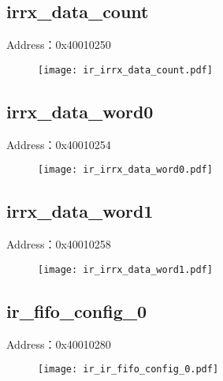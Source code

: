 \subsection{irrx\_data\_count}
\label{ir-irrx-data-count}
Address：0x40010250
 \begin{figure}[H]
\texttt{[image: ir\_irrx\_data\_count.pdf]}
\end{figure}

\subsection{irrx\_data\_word0}
\label{ir-irrx-data-word0}
Address：0x40010254
 \begin{figure}[H]
\texttt{[image: ir\_irrx\_data\_word0.pdf]}
\end{figure}

\subsection{irrx\_data\_word1}
\label{ir-irrx-data-word1}
Address：0x40010258
 \begin{figure}[H]
\texttt{[image: ir\_irrx\_data\_word1.pdf]}
\end{figure}

\subsection{ir\_fifo\_config\_0}
\label{ir-ir-fifo-config-0}
Address：0x40010280
 \begin{figure}[H]
\texttt{[image: ir\_ir\_fifo\_config\_0.pdf]}
\end{figure}

